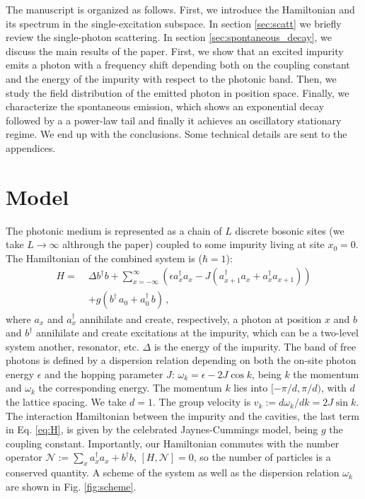 \documentclass[aps,pra,twocolumn,floatfix,superscriptaddress]{revtex4-1}%
\begin{document}
The manuscript is organized as follows. First, we introduce the Hamiltonian and its spectrum in the single-excitation subspace.  In section \ref{sec:scatt} we briefly review the single-photon scattering. In section \ref{sec:spontaneous_decay}, we discuss the main results of the paper. First, we show that an excited impurity emits a photon with a frequency shift depending both on the coupling constant and the energy of the impurity with respect to the photonic band.  Then, we study the field distribution of the emitted photon in position space. Finally,  we characterize the spontaneous emission, which shows an exponential decay followed by a a power-law tail and finally it achieves an oscillatory stationary regime.
We end up with the conclusions. Some technical details are sent to the appendices.


\section{Model}

The photonic medium is represented as a chain of $L$ discrete bosonic sites (we take $L\to\infty$ althrough the paper) coupled to some impurity living at site $x_0=0$. 
The Hamiltonian of the combined system is ($\hbar =1$):
\begin{align}
\label{eq:H} H   = \; &  
\Delta b^\dagger b  + 
\sum_{x=-\infty}^\infty \left(\epsilon a^\dagger_x a_x -  J ( a_{x+1}^\dagger a_x  + a_{x}^\dagger a_{x+1})\right)
 \nonumber\\
&  + g ( b^\dagger \,  a_0 +   a_0^\dagger \, b) \, ,
\end{align}
where $a_{x}$ and $a_{x}^\dagger$  annihilate and create, respectively, a photon at position $x$ and $b$ and $b^\dagger$ annihilate and create excitations at the impurity,
 which can be a two-level system another, resonator, etc. 
$\Delta$ is the energy of the impurity.  
The band of free photons is defined by a dispersion relation depending on both the on-site photon energy $\epsilon$ and the hopping parameter $J$:  $\omega_k = \epsilon  - 2 J \cos k$, being $k$ the momentum and $\omega_k$ the corresponding energy. The momentum $k$ lies into $[-\pi/d,\pi/d)$, with $d$ the lattice spacing. We take $d=1$. The group velocity is $v_k:=d\omega_k/dk=2J\sin k$. 
The interaction Hamiltonian between the impurity and the cavities, the last term in Eq. \eqref{eq:H}, is given by the celebrated Jaynes-Cummings model, being $g$ the coupling constant.
Importantly, our Hamiltonian commutes with the number operator $\mathcal{N}:= \sum_x a_x^\dagger a_x + b^\dagger b$, $[H,\mathcal{N}]=0$, so the number of particles is a conserved quantity. 
A scheme of the system as well as the dispersion relation $\omega_k$ are shown in Fig. \ref{fig:scheme}.
\end{document}
